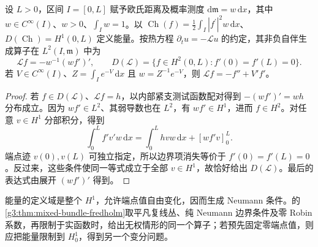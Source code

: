 \begin{proposition}\label{g3:prop:C-weighted-neumann-generator}
	设 \(L>0\)，区间 \(I=[0,L]\) 赋予欧氏距离及概率测度 \(\mathrm d\mathfrak m=w\,\mathrm dx\)，其中 \(w\in C^\infty(I)\)、\(w>0\)、\(\int_Iw=1\)。以 \(\operatorname{Ch}(f)=\tfrac12\int_I|f^\prime|^2w\,\mathrm dx\)、\(D(\operatorname{Ch})=H^1(0,L)\) 定义能量。按热方程 \(\partial_tu=-\mathcal Lu\) 的约定，其非负自伴生成算子在 \(L^2(I,\mathfrak m)\) 中为
	\[
		\mathcal Lf=-w^{-1}(wf')',\qquad
		D(\mathcal L)=\{f\in H^2(0,L):f'(0)=f'(L)=0\}.
	\]
	若 \(V\in C^\infty(I)\)、\(Z=\int_Ie^{-V}\,\mathrm dx\) 且 \(w=Z^{-1}e^{-V}\)，则 \(\mathcal Lf=-f''+V'f'\)。
\end{proposition}
\begin{proof}
	若 \(f\in D(\mathcal L)\)、\(\mathcal Lf=h\)，以内部紧支测试函数配对得到 \(-(wf')'=wh\) 分布成立。因为 \(wf'\in L^2\)、其弱导数也在 \(L^2\)，有 \(wf'\in H^1\)，进而 \(f\in H^2\)。对任意 \(v\in H^1\) 分部积分，得到
	\[
		\int_0^L f'v'w\,\mathrm dx
		=\int_0^Lhv w\,\mathrm dx+[wf'v]_0^L.
	\]
	端点迹 \(v(0),v(L)\) 可独立指定，所以边界项消失等价于 \(f'(0)=f'(L)=0\)。反过来，这些条件使同一等式成立于全部 \(v\in H^1\)，故恰好给出 \(D(\mathcal L)\)。最后的表达式由展开 \((wf')'\) 得到。
\end{proof}

能量的定义域是整个 \(H^1\)，允许端点值自由变化，因而生成 Neumann 条件。的\cref{g3:thm:mixed-bundle-fredholm}取平凡复线丛、纯 Neumann 边界条件及零 Robin 系数，再限制于实函数时，给出无权情形的同一个算子；若预先固定零端点值，则应把能量限制到 \(H_0^1\)，得到另一个变分问题。

